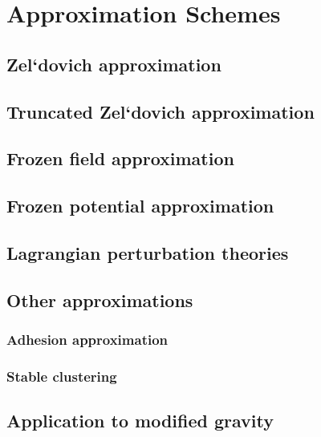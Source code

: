 \chapter{Approximation Schemes}

\section{Zel`dovich approximation}

\section{Truncated Zel`dovich approximation}

\section{Frozen field approximation}

\section{Frozen potential approximation}

\section{Lagrangian perturbation theories}

\section{Other approximations}
\subsection{Adhesion approximation}
\subsection{Stable clustering}

\section{Application to modified gravity}